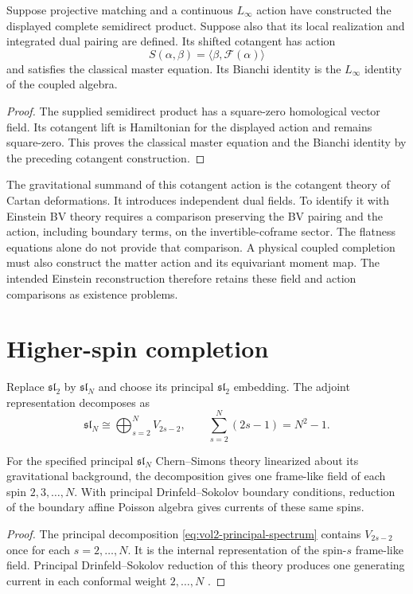 \begin{theorem}
Suppose projective matching and a continuous $L_\infty$ action have constructed the displayed complete semidirect product. Suppose also that its local realization and integrated dual pairing are defined. Its shifted cotangent has action
\[
 S(\alpha,\beta)=\langle\beta,\mathcal F(\alpha)\rangle
\]
and satisfies the classical master equation. Its Bianchi identity is the $L_\infty$ identity of the coupled algebra.
\end{theorem}
\begin{proof}
The supplied semidirect product has a square-zero homological vector field. Its cotangent lift is Hamiltonian for the displayed action and remains square-zero. This proves the classical master equation and the Bianchi identity by the preceding cotangent construction.
\end{proof}

The gravitational summand of this cotangent action is the cotangent theory of Cartan deformations. It introduces independent dual fields. To identify it with Einstein BV theory requires a comparison preserving the BV pairing and the action, including boundary terms, on the invertible-coframe sector. The flatness equations alone do not provide that comparison. A physical coupled completion must also construct the matter action and its equivariant moment map. The intended Einstein reconstruction therefore retains these field and action comparisons as existence problems.

\chapter{Higher-spin completion}
Replace $\mathfrak{sl}_2$ by $\mathfrak{sl}_N$ and choose its principal $\mathfrak{sl}_2$ embedding.  The adjoint representation decomposes as
\[
 \mathfrak{sl}_N
 \cong\bigoplus_{s=2}^{N}V_{2s-2},
 \qquad
 \sum_{s=2}^{N}(2s-1)=N^2-1.
\]

\begin{theorem}
For the specified principal $\mathfrak{sl}_N$ Chern--Simons theory
linearized about its gravitational background, the decomposition gives
one frame-like field of each spin $2,3,\ldots,N$.
With principal Drinfeld--Sokolov boundary conditions, reduction of the
boundary affine Poisson algebra gives currents of these same spins.
\end{theorem}
\begin{proof}
The principal decomposition \eqref{eq:vol2-principal-spectrum}
contains $V_{2s-2}$ once for each $s=2,\ldots,N$.
It is the internal representation of the spin-$s$ frame-like field.
Principal Drinfeld--Sokolov reduction of this theory produces one
generating current in each conformal weight $2,\ldots,N$
\cite{CampoleoniHigherSpin,HenneauxRey}.
\end{proof}

